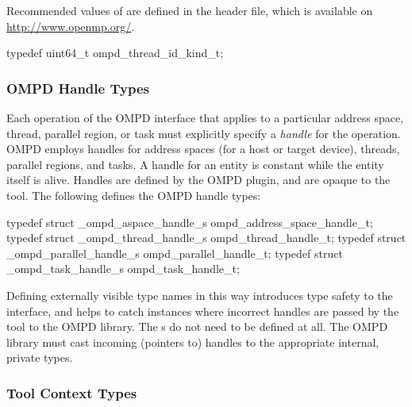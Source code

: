 Recommended values of  are defined in the  
header file, which is available on \url{http://www.openmp.org/}. 

\label{ompd:ompd_thread_id_kind_t}
\format

\begin{ccppspecific}
\begin{ompSyntax}
typedef uint64_t ompd_thread_id_kind_t;
\end{ompSyntax}
\end{ccppspecific}


\subsubsection{OMPD Handle Types}
\label{subsubsec:ompd_address_space_handle_t}
\label{subsubsec:ompd_thread_handle_t}
\label{subsubsec:ompd_parallel_handle_t}
\label{subsubsec:ompd_task_handle_t}

Each operation of the OMPD interface that applies to a particular address space, thread, parallel 
region, or task must explicitly specify
a \emph{handle} for the operation.
OMPD employs handles for address spaces (for a host or target device), threads, parallel regions, 
and tasks. A handle for an entity is constant while the entity itself is alive. Handles are defined by 
the OMPD plugin, and are opaque to the tool. The following defines the OMPD 
handle types:

\format

\begin{ccppspecific}
\begin{ompSyntax}
typedef struct _ompd_aspace_handle_s ompd_address_space_handle_t;
typedef struct _ompd_thread_handle_s ompd_thread_handle_t;
typedef struct _ompd_parallel_handle_s ompd_parallel_handle_t;
typedef struct _ompd_task_handle_s ompd_task_handle_t;
\end{ompSyntax}
\end{ccppspecific}


Defining externally visible type names in this way introduces type safety to the interface, and helps 
to catch instances where incorrect handles are passed by the tool to the OMPD 
library. The s do not need to be defined at all. The OMPD library 
must cast incoming (pointers to) handles to the appropriate internal, private types.

\subsubsection{Tool Context Types}
\label{subsubsec:ompd_address_space_context_t}
\label{subsubsec:ompd_thread_context_t}

